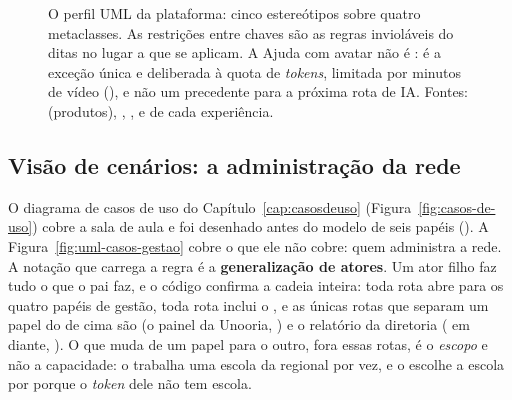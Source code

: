 \begin{figure}[H]
{}
\caption[Perfil UML da plataforma]{O perfil UML da plataforma: cinco estereótipos
  sobre quatro metaclasses. As restrições entre chaves são as regras
  invioláveis do  ditas no lugar a que se aplicam. A Ajuda com
  avatar não é : é a exceção única e deliberada à quota de
  \emph{tokens}, limitada por minutos de vídeo (), e não um
  precedente para a próxima rota de IA. Fontes:
   (produtos), ,
  ,  e
   de cada experiência.}
\label{fig:uml-perfil}
\end{figure}

\subsection{Visão de cenários: a administração da rede}
\label{sec:uml-cenarios}

O diagrama de casos de uso do Capítulo~\ref{cap:casosdeuso}
(Figura~\ref{fig:casos-de-uso}) cobre a sala de aula e foi desenhado antes do
modelo de seis papéis (). A Figura~\ref{fig:uml-casos-gestao} cobre
o que ele não cobre: quem administra a rede. A notação que carrega a regra é a
\textbf{generalização de atores}. Um ator filho faz tudo o que o pai faz, e o
código confirma a cadeia inteira: toda rota  abre para os quatro
papéis de gestão, toda rota  inclui o , e
as únicas rotas que separam um papel do de cima são  (o painel
da Unooria, ) e o relatório da diretoria ( em
diante, ). O que muda de um papel para o outro, fora essas rotas, é
o \emph{escopo} e não a capacidade: o  trabalha uma escola
da regional por vez, e o  escolhe a escola por
 porque o \emph{token} dele não tem escola.

